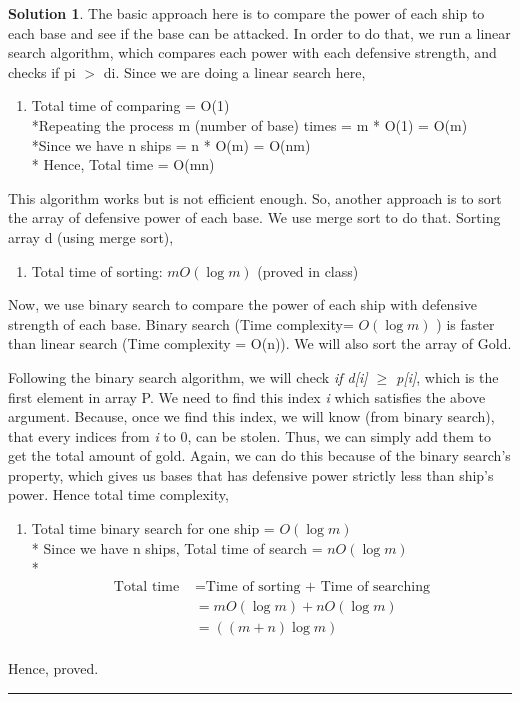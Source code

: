 \documentclass{article}
\theoremstyle{definition}
\def\fline{\rule{0.75\linewidth}{0.5pt}}
\newcommand{\finishline}{\begin{center}\fline\end{center}}
\newtheorem*{solution*}{Solution}
\newenvironment{solution}{\begin{solution*}}{{\finishline} \end{solution*}}
\begin{document}
\begin{solution}
The basic approach here is to compare the power of each ship to each base and see if the base can be attacked. In order to do that, we run a linear search algorithm, which compares each power with each defensive strength, and checks if pi $>$ di. 
Since we are doing a linear search here,
	\begin{enumerate}
		\item[]Total time of comparing = O(1)\\*Repeating the process m (number of base) times = m * O(1) = O(m)\\*Since we have n ships = n * O(m) = O(nm)\bigskip\\* Hence, Total time = O(mn)
	\end{enumerate}

This algorithm works but is not efficient enough. So, another approach is to sort the array of defensive power of each base. We use merge sort to do that. Sorting array d (using merge sort),
	\begin{enumerate}
		\item[]Total time of sorting: $ mO(\log m)$ (proved in class)
	\end{enumerate}
Now, we use binary search to compare the power of each ship with defensive strength of each base. Binary search (Time complexity= $O(\log m)$ ) is faster than linear search (Time complexity = O(n)). We will also sort the array of Gold.

Following the binary search algorithm, we will check {\textit {if d[i] $\geq$ p[i]}}, which is the first element in array P. We need to find this index {\textit {i}} which satisfies the above argument. Because, once we find this index, we will know (from binary search), that every indices from {\textit {i}} to 0, can be stolen. Thus, we can simply add them to get the total amount of gold. Again, we can do this because of the binary search's property, which gives us bases that has defensive power strictly less than ship's power. Hence total time complexity, 
	\begin{enumerate}
		\item[]Total time binary search for one ship = $O(\log m)$ \\*
		Since we have n ships, Total time of search = $nO(\log m)$ \\*
		\begin{align*}
			{\text{Total time }} &= {\text{Time of sorting + Time of searching}} \\
		          &= mO(\log m) + nO(\log m)  \\
		          &= ((m+n)\log m)\\
		\end{align*}
	\end{enumerate}
Hence, proved.


\end{solution}
\end{document}
